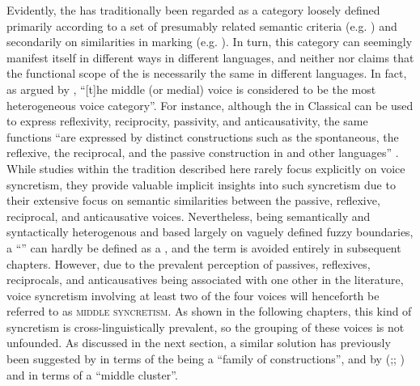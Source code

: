 \hspace*{-1.5mm}Evidently, the  has traditionally been regarded as a category loosely defined primarily according to a set of presumably related semantic criteria (e.g. \citealt[238]{kemmer:1993}) and secondarily on similarities in marking (e.g. \citealt[15ff.]{kemmer:1993}). In turn, this category can seemingly manifest itself in different ways in different languages, and neither \citeauthor{klaiman:1991} nor \citeauthor{kemmer:1993} claims that the functional scope of the  is necessarily the same in different languages. In fact, as argued by \citet[1149]{shibatani:2004}, “[t]he middle (or medial) voice is considered to be the most heterogeneous voice category”. For instance, although the  in Classical  can be used to express reflexivity, reciprocity, passivity, and anticausativity, the same functions “are expressed by distinct constructions such as the spontaneous, the reflexive, the reciprocal, and the passive construction in  and other languages” \citep[1157]{shibatani:2004}. While studies within the tradition described here rarely focus explicitly on voice syncretism, they provide valuable implicit insights into such syncretism due to their extensive focus on semantic similarities between the passive, reflexive, reciprocal, and anticausative voices. Nevertheless, being semantically and syntactically heterogenous and based largely on vaguely defined fuzzy boundaries, a “” can hardly be defined as a , and the term is avoided entirely in subsequent chapters. However, due to the prevalent perception of passives, reflexives, reciprocals, and anticausatives being associated with one other in the literature, voice syncretism involving at least two of the four voices will henceforth be referred to as \textsc{middle syncretism}. As shown in the following chapters, this kind of syncretism is cross-linguistically prevalent, so the grouping of these voices is not unfounded. As discussed in the next section, a similar solution has previously been suggested by \citet{shibatani:2004} in terms of the  being a “family of constructions”, and by \citeauthor{kulikov:2010} (\citeyear[394f.]{kulikov:2010};; \citeyear[265ff.]{kulikov:2013}) and \citet[175ff.]{zuniga:kittila:2019} in terms of a “middle cluster”.

